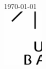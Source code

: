 \begin{titlepage}
\begin{center}
\vfill

{\large \today} \\[1.5cm]



\includegraphics[width=0.15\textwidth]{figures/unilogoschwarz}~\\[1cm]
\end{center}
\end{titlepage}
